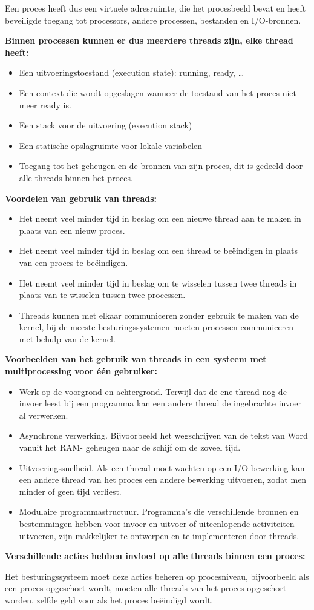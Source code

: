 Een proces heeft dus een virtuele adresruimte, die het procesbeeld bevat en heeft beveiligde toegang tot processors, andere processen, bestanden en I/O-bronnen.

\newpage

\textbf{Binnen processen kunnen er dus meerdere threads zijn, elke thread heeft:}

\begin{itemize}
\item Een uitvoeringstoestand (execution state): running, ready, …
\item Een context die wordt opgeslagen wanneer de toestand van het proces niet meer ready is.
\item Een stack voor de uitvoering (execution stack)
\item Een statische opslagruimte voor lokale variabelen
\item Toegang tot het geheugen en de bronnen van zijn proces, dit is gedeeld door alle threads binnen het proces.
\end{itemize}

\textbf{Voordelen van gebruik van threads:}

\begin{itemize}
\item Het neemt veel minder tijd in beslag om een nieuwe thread aan te maken in plaats van een nieuw proces.
\item Het neemt veel minder tijd in beslag om een thread te beëindigen in plaats van een proces te beëindigen.
\item Het neemt veel minder tijd in beslag om te wisselen tussen twee threads in plaats van te wisselen tussen twee processen.
\item Threads kunnen met elkaar communiceren zonder gebruik te maken van de kernel, bij de meeste besturingssystemen moeten processen communiceren met behulp van de kernel.
\end{itemize}

\textbf{Voorbeelden van het gebruik van threads in een systeem met multiprocessing voor één gebruiker:}

\begin{itemize}
\item Werk op de voorgrond en achtergrond. Terwijl dat de ene thread nog de invoer leest bij een programma kan een andere thread de ingebrachte invoer al verwerken.
\item Asynchrone verwerking. Bijvoorbeeld het wegschrijven van de tekst van Word vanuit het RAM- geheugen naar de schijf om de zoveel tijd.
\item Uitvoeringssnelheid. Als een thread moet wachten op een I/O-bewerking kan een andere thread van het proces een andere bewerking uitvoeren, zodat men minder of geen tijd verliest.
\item Modulaire programmastructuur. Programma’s die verschillende bronnen en bestemmingen hebben voor invoer en uitvoer of uiteenlopende activiteiten uitvoeren, zijn makkelijker te ontwerpen en te implementeren door threads.
\end{itemize}

\textbf{Verschillende acties hebben invloed op alle threads binnen een proces:}

Het besturingssysteem moet deze acties beheren op procesniveau, bijvoorbeeld als een proces opgeschort wordt, moeten alle threads van het proces opgeschort worden, zelfde geld voor als het proces beëindigd wordt.



